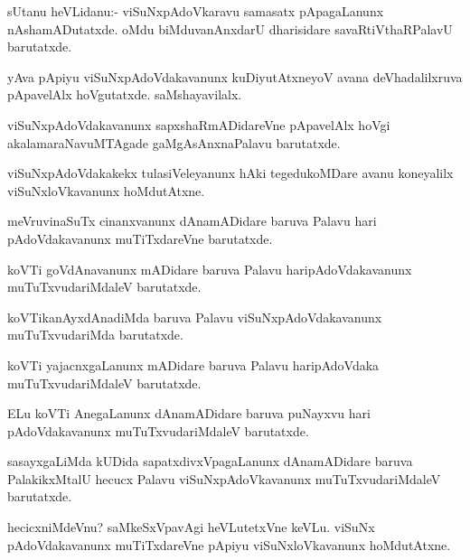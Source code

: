 \begin{mng}
sUtanu heVLidanu:- viSuNxpAdoVkaravu samasatx pApagaLanunx nAshamADutatxde. oMdu biMduvanAnxdarU dharisidare savaRtiVthaRPalavU barutatxde.
\end{mng}

\begin{mng}
yAva pApiyu viSuNxpAdoVdakavanunx kuDiyutAtxneyoV avana deVhadalilxruva pApavelAlx hoVgutatxde. saMshayavilalx.
\end{mng}

\begin{mng}
viSuNxpAdoVdakavanunx sapxshaRmADidareVne pApavelAlx hoVgi akalamaraNavuMTAgade gaMgAsAnxnaPalavu barutatxde.
\end{mng}

\begin{mng}
viSuNxpAdoVdakakekx tulasiVeleyanunx hAki tegedukoMDare avanu koneyalilx viSuNxloVkavanunx hoMdutAtxne.
\end{mng}

\begin{mng}
meVruvinaSuTx cinanxvanunx dAnamADidare baruva Palavu hari pAdoVdakavanunx muTiTxdareVne barutatxde.
\end{mng}

\begin{mng}
koVTi goVdAnavanunx mADidare baruva Palavu haripAdoVdakavanunx muTuTxvudariMdaleV barutatxde.
\end{mng}

\begin{mng}
koVTikanAyxdAnadiMda baruva Palavu viSuNxpAdoVdakavanunx muTuTxvudariMda barutatxde.
\end{mng}

\begin{mng}
koVTi yajacnxgaLanunx mADidare baruva Palavu haripAdoVdaka muTuTxvudariMdaleV barutatxde.
\end{mng}

\begin{mng}
ELu koVTi AnegaLanunx dAnamADidare baruva puNayxvu hari pAdoVdakavanunx muTuTxvudariMdaleV barutatxde.
\end{mng}

\begin{mng}
sasayxgaLiMda kUDida sapatxdivxVpagaLanunx dAnamADidare baruva PalakikxMtalU hecucx Palavu viSuNxpAdoVkavanunx muTuTxvudariMdaleV barutatxde.
\end{mng}

\begin{mng}
hecicxniMdeVnu? saMkeSxVpavAgi heVLutetxVne keVLu. viSuNx pAdoVdakavanunx muTiTxdareVne pApiyu viSuNxloVkavanunx hoMdutAtxne.
\end{mng}

